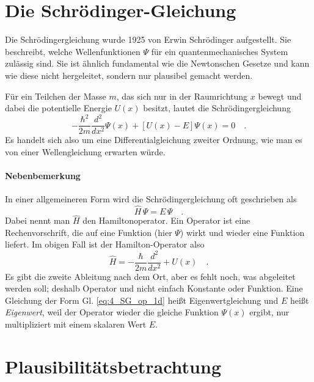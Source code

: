 \section{Die Schrödinger-Gleichung}

Die Schrödingergleichung wurde 1925 von Erwin Schrödinger aufgestellt. Sie beschreibt, welche Wellenfunktionen $\Psi$ für ein quantenmechanisches System zulässig sind. Sie ist ähnlich fundamental wie die Newtonschen Gesetze und kann wie diese nicht hergeleitet, sondern nur plausibel gemacht werden.

Für ein Teilchen der Masse $m$, das sich nur in der Raumrichtung $x$ bewegt und dabei die potentielle Energie $U(x)$ besitzt, lautet die Schrödingergleichung
\begin{equation}
   - \frac{\hbar^2}{2m} \frac{d^2}{dx^2} \Psi(x) + \left[ U(x) - E \right] \Psi(x) = 0 \quad .
   \label{eq:4_SG_1d}
 \end{equation}
 Es handelt sich also um eine Differentialgleichung zweiter Ordnung, wie man es von einer Wellengleichung erwarten würde.


\paragraph*{Nebenbemerkung} In einer allgemeineren Form wird die Schrödingergleichung oft  geschrieben als
\begin{equation}
    \hat{H} \, \Psi = E \, \Psi \quad .
    \label{eq:4_SG_op_1d}
\end{equation}
Dabei nennt man $\hat{H}$ den Hamiltonoperator. Ein Operator ist eine Rechenvorschrift, die auf eine Funktion (hier $\Psi$) wirkt und wieder eine Funktion liefert. Im obigen Fall ist der Hamilton-Operator also
\begin{equation}
    \hat{H} = - \frac{\hbar}{2m} \frac{d^2}{dx^2} + U(x) \quad .
\end{equation}
Es gibt die zweite Ableitung nach dem Ort, aber es fehlt noch, was abgeleitet werden soll; deshalb Operator und nicht einfach Konstante oder Funktion. 
Eine Gleichung der Form Gl. \ref{eq:4_SG_op_1d} heißt Eigenwertgleichung und $E$ heißt \emph{Eigenwert}, weil der Operator wieder die gleiche Funktion $\Psi(x)$ ergibt, nur multipliziert mit einem skalaren Wert $E$.

\section{Plausibilitätsbetrachtung}

